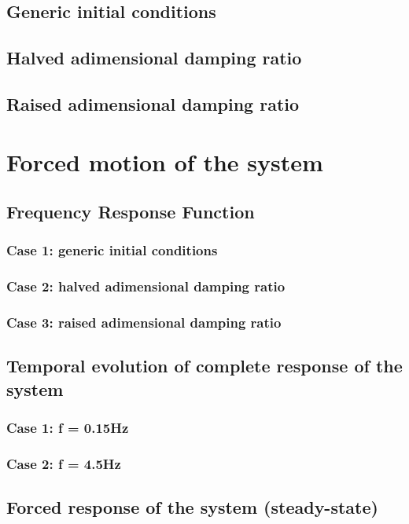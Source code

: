 \documentclass[a4paper,12pt,oneside]{article}
\begin{document}
\subsection{Generic initial conditions}



\subsection{Halved adimensional damping ratio}



\subsection{Raised adimensional damping ratio}



\section{Forced motion of the system}



\subsection{Frequency Response Function}



\subsubsection*{Case 1: generic initial conditions}



\subsubsection*{Case 2: halved adimensional damping ratio}



\subsubsection*{Case 3: raised adimensional damping ratio}



\subsection{Temporal evolution of complete response of the system}



\subsubsection*{Case 1: f = 0.15Hz}



\subsubsection*{Case 2: f = 4.5Hz}



\subsection{Forced response of the system (steady-state)}
\end{document}

